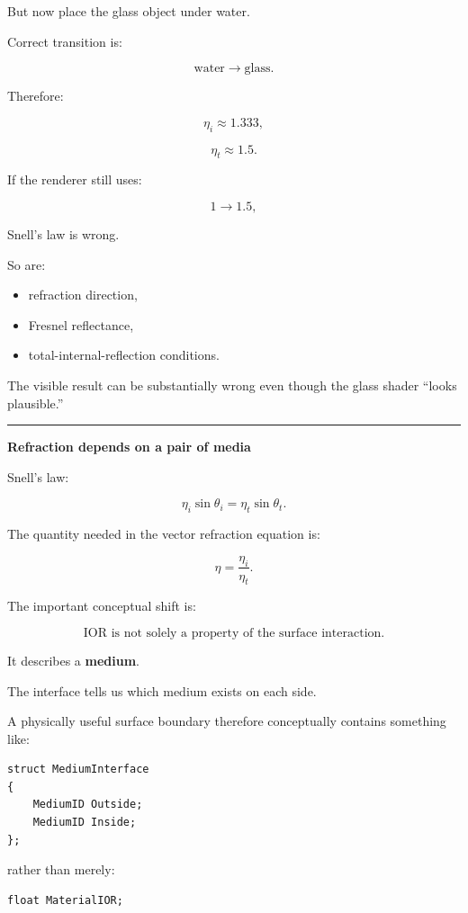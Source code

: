 But now place the glass object under water.

Correct transition is:

\[
\text{water}
\rightarrow
\text{glass}.
\]

Therefore:

\[
\eta_i\approx1.333,
\]

\[
\eta_t\approx1.5.
\]

If the renderer still uses:

\[
1\rightarrow1.5,
\]

Snell's law is wrong.

So are:

\begin{itemize}
\tightlist
\item
  refraction direction,
\item
  Fresnel reflectance,
\item
  total-internal-reflection conditions.
\end{itemize}

The visible result can be substantially wrong even though the glass shader ``looks plausible.''

\begin{center}\rule{0.5\linewidth}{0.5pt}\end{center}

\textbf{Refraction depends on a pair of media}

Snell's law:

\[
\boxed{
\eta_i\sin\theta_i
=
\eta_t\sin\theta_t.
}
\]

The quantity needed in the vector refraction equation is:

\[
\boxed{
\eta=
\frac{\eta_i}{\eta_t}.
}
\]

The important conceptual shift is:

\[
\boxed{
\text{IOR is not solely a property of the surface interaction.}
}
\]

It describes a \textbf{medium}.

The interface tells us which medium exists on each side.

A physically useful surface boundary therefore conceptually contains something like:

\begin{verbatim}
struct MediumInterface
{
    MediumID Outside;
    MediumID Inside;
};
\end{verbatim}

rather than merely:

\begin{verbatim}
float MaterialIOR;
\end{verbatim}


